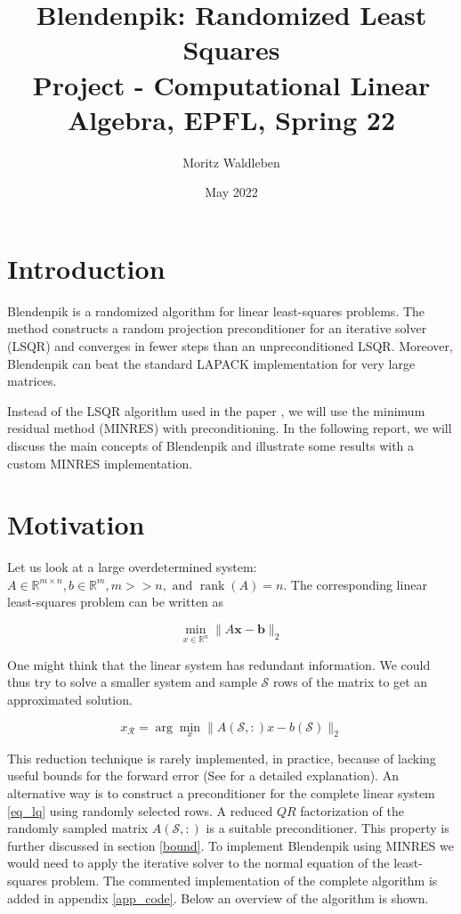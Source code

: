 \documentclass{article}
\title{Blendenpik: Randomized Least Squares \\[1ex] \large Project - Computational Linear Algebra, EPFL, Spring 22}
\author{Moritz Waldleben}
\date{May 2022}
\begin{document}
\maketitle

\section{Introduction} \label{intro}
Blendenpik \cite{blendenpik} is a randomized algorithm for linear
least-squares problems. The method constructs a random projection preconditioner
for an iterative solver (LSQR) and converges in fewer steps than an
unpreconditioned LSQR. Moreover, Blendenpik can beat the standard LAPACK
implementation for very large matrices. 

Instead of the LSQR algorithm used in the paper \cite{blendenpik}, we will use
the minimum residual method (MINRES) with preconditioning. In the following
report, we will discuss the main concepts of Blendenpik and illustrate some
results with a custom MINRES implementation.

\section{Motivation} \label{mot}
Let us look at a large overdetermined system: $A \in \mathbb{R}^{m \times n}, b
\in \mathbb{R}^{m}, m>>n, \text { and } \operatorname{rank}(A)=n$. The
corresponding linear least-squares problem can be written as

\begin{equation} \label{eq_lq}
\min _{x \in \mathbb{R}^{n}}\|A \mathbf{x}-\mathbf{b}\|_{2}
\end{equation}

One might think that the linear system has redundant information. We could thus
try to solve a smaller system and sample $\mathcal{S}$ rows of the matrix to
get an approximated solution.

\begin{equation} \label{eq_lq_red}
x_{\mathcal{R}}=\arg \min _{x}\|A(\mathcal{S},:) x-b(\mathcal{S})\|_{2}
\end{equation}

This reduction technique is rarely implemented, in practice, because of lacking
useful bounds for the forward error (See \cite{blendenpik} for a detailed
explanation). An alternative way is to construct a preconditioner for the
complete linear system \ref{eq_lq} using randomly selected rows. A reduced $QR$
factorization of the randomly sampled matrix $A(\mathcal{S},:)$ is a suitable
preconditioner. This property is further discussed in section \ref{bound}. To
implement Blendenpik using MINRES we would need to apply the iterative solver
to the normal equation of the least-squares problem. The commented
implementation of the complete algorithm is added in appendix
\ref{app_code}. Below an overview of the algorithm is shown.
\end{document}
